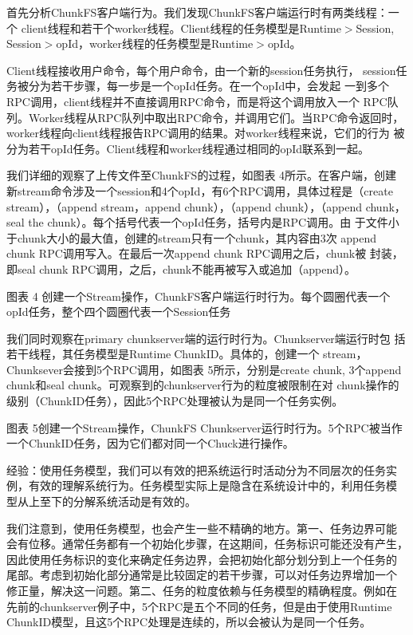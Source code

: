 
首先分析ChunkFS客户端行为。我们发现ChunkFS客户端运行时有两类线程：一个
client线程和若干个worker线程。Client线程的任务模型是Runtime$>$Session,
Session$>$opId，worker线程的任务模型是Runtime$>$opId。

Client线程接收用户命令，每个用户命令，由一个新的session任务执行，
session任务被分为若干步骤，每一步是一个opId任务。在一个opId中，会发起
一到多个RPC调用，client线程并不直接调用RPC命令，而是将这个调用放入一个
RPC队列。Worker线程从RPC队列中取出RPC命令，并调用它们。当RPC命令返回时，
worker线程向client线程报告RPC调用的结果。对worker线程来说，它们的行为
被分为若干opId任务。Client线程和worker线程通过相同的opId联系到一起。

我们详细的观察了上传文件至ChunkFS的过程，如图表 4所示。在客户端，创建
新stream命令涉及一个session和4个opId，有6个RPC调用，具体过程是（create
stream），（append stream，append chunk），（append chunk），（append
chunk，seal the chunk）。每个括号代表一个opId任务，括号内是RPC调用。由
于文件小于chunk大小的最大值，创建的stream只有一个chunk，其内容由3次
append chunk RPC调用写入。在最后一次append chunk RPC调用之后，chunk被
封装，即seal chunk RPC调用，之后，chunk不能再被写入或追加（append）。

 
图表 4 创建一个Stream操作，ChunkFS客户端运行时行为。每个圆圈代表一个
opId任务，整个四个圆圈代表一个Session任务


我们同时观察在primary chunkserver端的运行时行为。Chunkserver端运行时包
括若干线程，其任务模型是RuntimeChunkID。具体的，创建一个
stream，Chunksever会接到5个RPC调用，如图表 5所示，分别是create chunk,
3个append chunk和seal chunk。可观察到的chunkserver行为的粒度被限制在对
chunk操作的级别（ChunkID任务），因此5个RPC处理被认为是同一个任务实例。

 
图表 5创建一个Stream操作，ChunkFS Chunkserver运行时行为。5个RPC被当作
一个ChunkID任务，因为它们都对同一个Chuck进行操作。


经验：使用任务模型，我们可以有效的把系统运行时活动分为不同层次的任务实
例，有效的理解系统行为。任务模型实际上是隐含在系统设计中的，利用任务模
型从上至下的分解系统活动是有效的。

我们注意到，使用任务模型，也会产生一些不精确的地方。第一、任务边界可能
会有位移。通常任务都有一个初始化步骤，在这期间，任务标识可能还没有产生，
因此使用任务标识的变化来确定任务边界，会把初始化部分划分到上一个任务的
尾部。考虑到初始化部分通常是比较固定的若干步骤，可以对任务边界增加一个
修正量，解决这一问题。第二、任务的粒度依赖与任务模型的精确程度。例如在
先前的chunkserver例子中，5个RPC是五个不同的任务，但是由于使用Runtime
ChunkID模型，且这5个RPC处理是连续的，所以会被认为是同一个任务。


